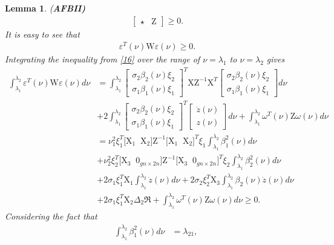 \documentclass[preprint,11pt]{elsarticle}
\newtheorem{lemma}{Lemma}
\begin{document}
\begin{lemma} {(\bf AFBII)}
\begin{eqnarray*}
\begin{bmatrix}
  \star&         \mathrm{Z}
\end{bmatrix}\geq0.
\end{eqnarray*}
It is easy to see that
\begin{align}\label{16}
\varepsilon^T(\nu)\mathrm{W} \varepsilon(\nu)\geq0.
\end{align}
Integrating the inequality from \eqref{16} over the range of $\nu=\lambda_1$ to $\nu=\lambda_2$ gives
\begin{align}\label{17}
\int^{\lambda_2}_{\lambda_1}\varepsilon^T(\nu)\mathrm{W} \varepsilon(\nu)d\nu
&=\int^{\lambda_2}_{\lambda_1}
\begin{bmatrix}
\sigma_2\beta_2(\nu)\xi_2\\
\sigma_1\beta_1(\nu)\xi_1
\end{bmatrix}^T
\mathrm{X}\mathrm{Z}^{-1}\mathrm{X}^T
\begin{bmatrix}
\sigma_2\beta_2(\nu)\xi_2\\
\sigma_1\beta_1(\nu)\xi_1
\end{bmatrix}
d\nu \nonumber\\
&+2\int^{\lambda_2}_{\lambda_1}
\begin{bmatrix}
\sigma_2\beta_2(\nu)\xi_2\\
\sigma_1\beta_1(\nu)\xi_1
\end{bmatrix}^T
\begin{bmatrix}
\dot{z}(\nu)\\
z(\nu)
\end{bmatrix}
d\nu
+\int^{\lambda_2}_{\lambda_1}{\omega}^T(\nu)\mathrm{Z}{\omega}(\nu)d\nu\nonumber\\
&=\nu^2_1\xi_1^T \big[\mathrm{X}_1\;\;\mathrm{X}_2 \big]\mathrm{Z}^{-1}\big[ \mathrm{X}_1\;\;\mathrm{X}_2 \big]^T\xi_1
\int^{\lambda_2}_{\lambda_1} \beta^2_1(\nu)d\nu\nonumber\\
&+\nu^2_2\xi_2^T\big[ \mathrm{X}_3\;\;0_{gn\times2n} \big]\mathrm{Z}^{-1}\big[ \mathrm{X}_3\;\;0_{gn\times2n} \big]^T\xi_2
\int^{\lambda_2}_{\lambda_1} \beta^2_2(\nu)d\nu\nonumber\\
&+2\sigma_1\xi_1^T\mathrm{X}_1\int^{\lambda_2}_{\lambda_1}\dot{z}(\nu)d\nu
+2\sigma_2\xi_2^T\mathrm{X}_3\int^{\lambda_2}_{\lambda_1}\beta_2(\nu)\dot{z}(\nu)d\nu\nonumber\\
&+2\sigma_1\xi_1^T\mathrm{X}_2\Delta_2\Re
+\int^{\lambda_2}_{\lambda_1}{\omega}^T(\nu)\mathrm{Z}{\omega}(\nu)d\nu\geq0.
\end{align}
Considering the fact that
\begin{align}
\int^{\lambda_2}_{\lambda_1}\beta^2_1(\nu)d\nu&=\lambda_{21},\;

\end{align}
\end{lemma}
\end{document}
